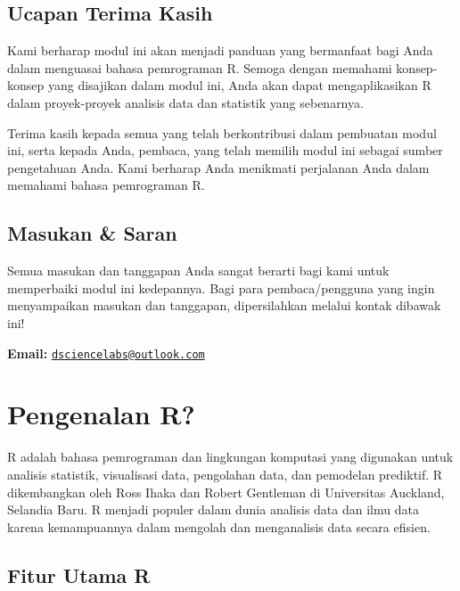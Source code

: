 \documentclass[
]{book}
\begin{document}
\hypertarget{ucapan-terima-kasih}{%
\section*{Ucapan Terima Kasih}\label{ucapan-terima-kasih}}

Kami berharap modul ini akan menjadi panduan yang bermanfaat bagi Anda dalam menguasai bahasa pemrograman R. Semoga dengan memahami konsep-konsep yang disajikan dalam modul ini, Anda akan dapat mengaplikasikan R dalam proyek-proyek analisis data dan statistik yang sebenarnya.

Terima kasih kepada semua yang telah berkontribusi dalam pembuatan modul ini, serta kepada Anda, pembaca, yang telah memilih modul ini sebagai sumber pengetahuan Anda. Kami berharap Anda menikmati perjalanan Anda dalam memahami bahasa pemrograman R.

\hypertarget{masukan-saran}{%
\section*{Masukan \& Saran}\label{masukan-saran}}

Semua masukan dan tanggapan Anda sangat berarti bagi kami untuk memperbaiki modul ini kedepannya. Bagi para pembaca/pengguna yang ingin menyampaikan masukan dan tanggapan, dipersilahkan melalui kontak dibawak ini!

\textbf{Email:} \href{mailto:dsciencelabs@outlook.com}{\nolinkurl{dsciencelabs@outlook.com}}

\hypertarget{pengenalan-r}{%
\chapter{Pengenalan R?}\label{pengenalan-r}}

R adalah bahasa pemrograman dan lingkungan komputasi yang digunakan untuk analisis statistik, visualisasi data, pengolahan data, dan pemodelan prediktif. R dikembangkan oleh Ross Ihaka dan Robert Gentleman di Universitas Auckland, Selandia Baru. R menjadi populer dalam dunia analisis data dan ilmu data karena kemampuannya dalam mengolah dan menganalisis data secara efisien.

\hypertarget{fitur-utama-r}{%
\section{Fitur Utama R}\label{fitur-utama-r}}
\end{document}

